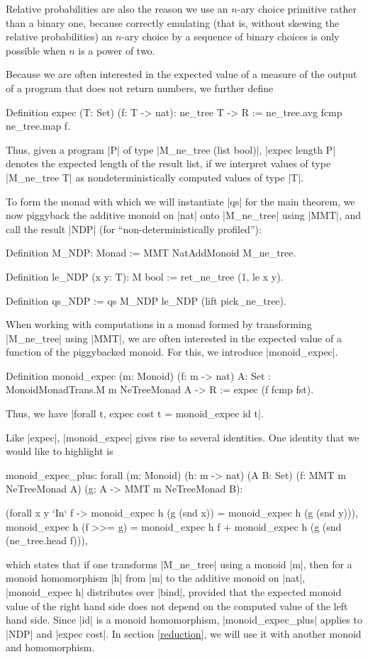 \documentclass[runningheads]{llncs}
\begin{document}
Relative probabilities are also the reason we use an $n$-ary choice primitive rather than a binary one, because correctly emulating (that is, without skewing the relative probabilities) an $n$-ary choice by a sequence of binary choices is only possible when $n$ is a power of two.

Because we are often interested in the expected value of a measure of the output of a program that does not return numbers, we further define

\begin{code}
  Definition expec (T: Set) (f: T -> nat): ne_tree T -> R
    := ne_tree.avg fcmp ne_tree.map f.
\end{code}

Thus, given a program |P| of type |M_ne_tree (list bool)|, |expec length P| denotes the expected length of the result list, if we interpret values of type |M_ne_tree T| as nondeterministically computed values of type |T|.

To form the monad with which we will instantiate |qs| for the main theorem, we now piggyback the additive monoid on |nat| onto |M_ne_tree| using |MMT|, and call the result |NDP| (for ``non-deterministically profiled''):
\begin{code}
  Definition M_NDP: Monad := MMT NatAddMonoid M_ne_tree.

  Definition le_NDP (x y: T): M bool := ret_ne_tree (1, le x y).

  Definition qs_NDP := qs M_NDP le_NDP (lift pick_ne_tree).
\end{code}

When working with computations in a monad formed by transforming |M_ne_tree| using |MMT|, we are often interested in the expected value of a function of the piggybacked monoid. For this, we introduce |monoid_expec|.
\begin{code}
  Definition monoid_expec (m: Monoid) (f: m -> nat) {A: Set}
    : MonoidMonadTrans.M m NeTreeMonad A -> R := expec (f fcmp fst).
\end{code}
Thus, we have |forall t, expec cost t = monoid_expec id t|.

Like |expec|, |monoid_expec| gives rise to several identities. One identity that we would like to highlight is
\begin{code}
  monoid_expec_plus: forall (m: Monoid) (h: m -> nat) (A B: Set)
    (f: MMT m NeTreeMonad A) (g: A -> MMT m NeTreeMonad B):

    (forall x y `In` f -> monoid_expec h (g (snd x)) = monoid_expec h (g (snd y))),
    monoid_expec h (f >>= g) =
      monoid_expec h f + monoid_expec h (g (snd (ne_tree.head f))),
\end{code}
which states that if one transforms |M_ne_tree| using a monoid |m|, then for a monoid homomorphism |h| from |m| to the additive monoid on |nat|, |monoid_expec h| distributes over |bind|, provided that the expected monoid value of the right hand side does not depend on the computed value of the left hand side. Since |id| is a monoid homomorphism, |monoid_expec_plus| applies to |NDP| and |expec cost|. In section \ref{reduction}, we will use it with another monoid and homomorphism.
\end{document}
